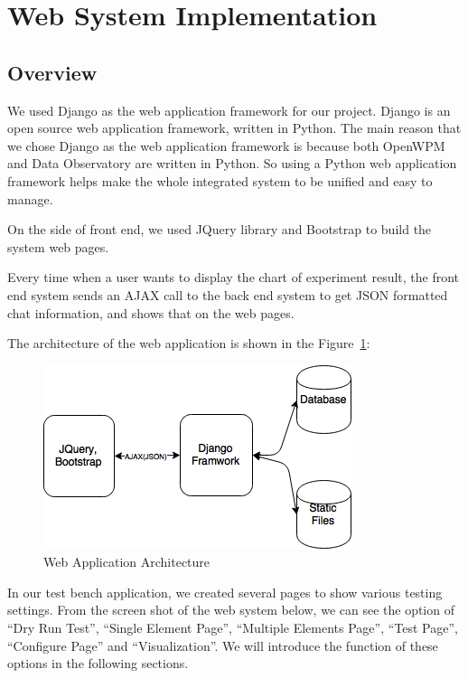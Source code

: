 \documentclass[fleqn,12pt]{SelfArx} %
\begin{document}
\section{Web System Implementation}
\subsection{Overview}
We used Django as the web application framework for our project. Django is an open source web application framework, written in Python. The main reason that we chose Django as the web application framework is because both OpenWPM and Data Observatory are written in Python. So using a Python web application framework helps make the whole integrated system to be unified and easy to manage.\par
On the side of front end, we used JQuery library and Bootstrap to build the system web pages.\par
Every time when a user wants to display the chart of experiment result, the front end system sends an AJAX call to the back end system to get JSON formatted chat information, and shows that on the web pages.\par
The architecture of the web application is shown in the Figure~\ref{fig:webAppArchiecture}:\par
\begin{figure}[h!]
	\includegraphics[width=\linewidth]{web_application_architecture.png}
    \caption{Web Application Architecture}
    \label{fig:webAppArchiecture}
\end{figure}
In our test bench application, we created several pages to show various testing settings. From the screen shot of the web system below, we can see the option of “Dry Run Test”, “Single Element Page”, “Multiple Elements Page”, “Test Page”, “Configure Page” and “Visualization”. We will introduce the function of these options in the following sections.
\end{document}
